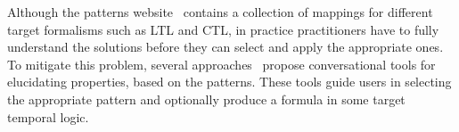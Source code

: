 \documentclass[letter]{llncs}
\begin{document}
\vspace{-3 pt}
Although the patterns website~\cite{PSP} contains a collection
of mappings for different target formalisms such as LTL and CTL, 
in practice practitioners have to fully understand the
solutions before they can select and apply the appropriate ones.
To mitigate this problem, several
approaches~\cite{Smith02propel:an,konrad2005facilitating,Mondragon_prospec}
propose conversational tools for elucidating properties,
based on the patterns. These tools guide users in
selecting the appropriate pattern and optionally produce
a formula in some target temporal logic.  
\end{document}
